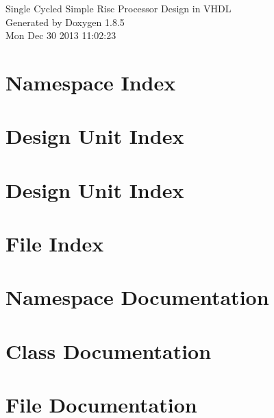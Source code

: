 \documentclass[twoside]{book}
\newcommand{\clearemptydoublepage}{%
  \newpage{\pagestyle{empty}\cleardoublepage}%
}
\begin{document}
\hypersetup{pageanchor=false}
\begin{titlepage}
\vspace*{7cm}
\begin{center}%
{\Large Single Cycled Simple Risc Processor Design in V\-H\-D\-L }\\
\vspace*{1cm}
{\large Generated by Doxygen 1.8.5}\\
\vspace*{0.5cm}
{\small Mon Dec 30 2013 11:02:23}\\
\end{center}
\end{titlepage}
\clearemptydoublepage
\tableofcontents
\clearemptydoublepage
{}
\hypersetup{pageanchor=true}

\chapter{Namespace Index}

\chapter{Design Unit Index}

\chapter{Design Unit Index}

\chapter{File Index}

\chapter{Namespace Documentation}

\chapter{Class Documentation}














\chapter{File Documentation}








\newpage
{}
{}
\printindex
\end{document}
